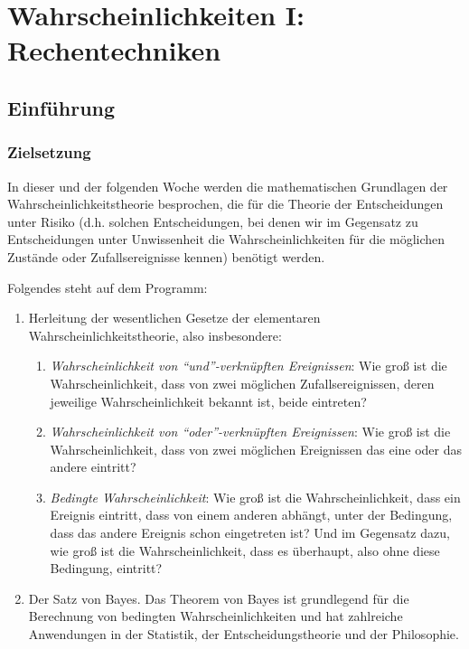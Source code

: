 \section{Wahrscheinlichkeiten I: Rechentechniken}
\subsection{Einführung}
\subsubsection{Zielsetzung}
\label{Wahrscheinlichkeitsrechnung}

In dieser und der folgenden Woche werden die mathematischen
Grundlagen der Wahrscheinlichkeitstheorie besprochen, die für die
Theorie der Entscheidungen unter Risiko (d.h. solchen Entscheidungen, bei denen
wir im Gegensatz zu Entscheidungen unter Unwissenheit die Wahrscheinlichkeiten
für die möglichen Zustände oder Zufallsereignisse kennen) benötigt werden. 

Folgendes steht auf dem Programm:

\begin{enumerate}
  \item Herleitung der wesentlichen Gesetze der elementaren
  Wahrscheinlichkeitstheorie, also insbesondere:
  \begin{enumerate}
    \item {\em Wahrscheinlichkeit von "`und"'-verknüpften Ereignissen}: Wie
    groß ist die Wahrscheinlichkeit, dass von zwei möglichen Zufallsereignissen,
    deren jeweilige Wahrscheinlichkeit bekannt ist, beide eintreten?
    \item {\em Wahrscheinlichkeit von "`oder"'-verknüpften Ereignissen}: Wie
    groß ist die Wahrscheinlichkeit, dass von zwei möglichen Ereignissen das
    eine oder das andere eintritt?
    \item {\em Bedingte Wahrscheinlichkeit}: Wie groß ist die
    Wahrscheinlichkeit, dass ein Ereignis eintritt, dass von einem anderen
    abhängt, unter der Bedingung, dass das andere Ereignis schon eingetreten
    ist? Und im Gegensatz dazu, wie groß ist die Wahrscheinlichkeit, dass es
    überhaupt, also ohne diese Bedingung, eintritt?
  \end{enumerate}
  \item Der Satz von Bayes. Das Theorem von Bayes ist grundlegend für die
  Berechnung von bedingten Wahrscheinlichkeiten und hat zahlreiche Anwendungen
  in der Statistik, der Entscheidungstheorie und der Philosophie.
\end{enumerate}

